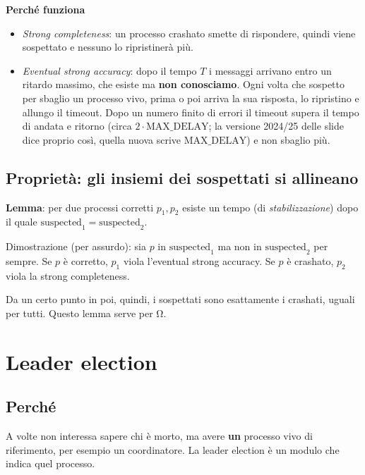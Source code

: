 \textbf{Perché funziona}

\begin{itemize}
\tightlist
\item
  \emph{Strong completeness}: un processo crashato smette di rispondere, quindi viene sospettato e nessuno lo ripristinerà più.
\item
  \emph{Eventual strong accuracy}: dopo il tempo \(T\) i messaggi arrivano entro un ritardo massimo, che esiste ma \textbf{non conosciamo}. Ogni volta che sospetto per sbaglio un processo vivo, prima o poi arriva la sua risposta, lo ripristino e allungo il timeout. Dopo un numero finito di errori il timeout supera il tempo di andata e ritorno (circa \(2 \cdot \text{MAX\_DELAY}\); la versione 2024/25 delle slide dice proprio così, quella nuova scrive \(\text{MAX\_DELAY}\)) e non sbaglio più.
\end{itemize}

\subsection{Proprietà: gli insiemi dei sospettati si allineano}

\textbf{Lemma}: per due processi corretti \(p_1, p_2\) esiste un tempo (di \emph{stabilizzazione}) dopo il quale \(\text{suspected}_1 = \text{suspected}_2\).

Dimostrazione (per assurdo): sia \(p\) in \(\text{suspected}_1\) ma non in \(\text{suspected}_2\) per sempre. Se \(p\) è corretto, \(p_1\) viola l'eventual strong accuracy. Se \(p\) è crashato, \(p_2\) viola la strong completeness.

Da un certo punto in poi, quindi, i sospettati sono esattamente i crashati, uguali per tutti. Questo lemma serve per Ω.

\section{Leader election}

\subsection{Perché}

\begin{inbreve}

A volte non interessa sapere chi è morto, ma avere \textbf{un} processo vivo di riferimento, per esempio un coordinatore. La leader election è un modulo che indica quel processo.

\end{inbreve}

